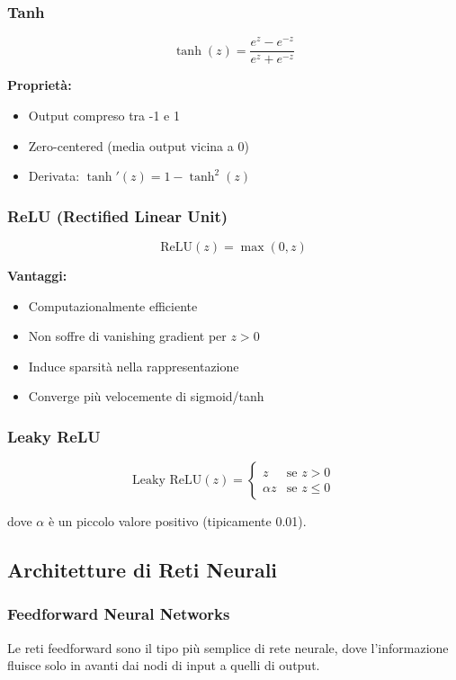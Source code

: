 \documentclass[12pt,a4paper,twoside]{report}
\begin{document}
\subsubsection{Tanh}
$$\tanh(z) = \frac{e^z - e^{-z}}{e^z + e^{-z}}$$

\textbf{Proprietà:}
\begin{itemize}
    \item Output compreso tra -1 e 1
    \item Zero-centered (media output vicina a 0)
    \item Derivata: $\tanh'(z) = 1 - \tanh^2(z)$
\end{itemize}

\subsubsection{ReLU (Rectified Linear Unit)}
$$\text{ReLU}(z) = \max(0, z)$$

\textbf{Vantaggi:}
\begin{itemize}
    \item Computazionalmente efficiente
    \item Non soffre di vanishing gradient per $z > 0$
    \item Induce sparsità nella rappresentazione
    \item Converge più velocemente di sigmoid/tanh
\end{itemize}

\subsubsection{Leaky ReLU}
$$\text{Leaky ReLU}(z) = \begin{cases} 
z & \text{se } z > 0 \\
\alpha z & \text{se } z \leq 0
\end{cases}$$

dove $\alpha$ è un piccolo valore positivo (tipicamente 0.01).

\subsection{Architetture di Reti Neurali}

\subsubsection{Feedforward Neural Networks}
Le reti feedforward sono il tipo più semplice di rete neurale, dove l'informazione fluisce solo in avanti dai nodi di input a quelli di output.
\end{document}
